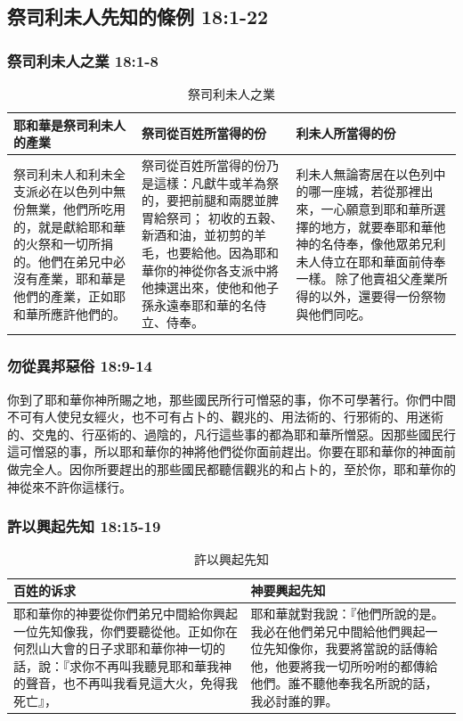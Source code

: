 \subsection{祭司利未人先知的條例 18:1-22 }
\subsubsection{祭司利未人之業 18:1-8 }
\begin{table}[H]
\begin{center}
\begin{tabular}{ p{4.9cm}|p{}|p{} } \toprule
耶和華是祭司利未人的產業&祭司從百姓所當得的份&利未人所當得的份\\\hline
祭司利未人和利未全支派必在以色列中無份無業，他們所吃用的，就是獻給耶和華的火祭和一切所捐的。他們在弟兄中必沒有產業，耶和華是他們的產業，正如耶和華所應許他們的。&祭司從百姓所當得的份乃是這樣：凡獻牛或羊為祭的，要把前腿和兩腮並脾胃給祭司； 初收的五穀、新酒和油，並初剪的羊毛，也要給他。因為耶和華你的神從你各支派中將他揀選出來，使他和他子孫永遠奉耶和華的名侍立、侍奉。&利未人無論寄居在以色列中的哪一座城，若從那裡出來，一心願意到耶和華所選擇的地方，就要奉耶和華他神的名侍奉，像他眾弟兄利未人侍立在耶和華面前侍奉一樣。 除了他賣祖父產業所得的以外，還要得一份祭物與他們同吃。 \\\hline
\end{tabular}
\end{center}
\caption{祭司利未人之業}
\end{table}


\subsubsection{勿從異邦惡俗 18:9-14}
你到了耶和華你神所賜之地，那些國民所行可憎惡的事，你不可學著行。你們中間不可有人使兒女經火，也不可有占卜的、觀兆的、用法術的、行邪術的、用迷術的、交鬼的、行巫術的、過陰的，凡行這些事的都為耶和華所憎惡。因那些國民行這可憎惡的事，所以耶和華你的神將他們從你面前趕出。你要在耶和華你的神面前做完全人。因你所要趕出的那些國民都聽信觀兆的和占卜的，至於你，耶和華你的神從來不許你這樣行。


\subsubsection{許以興起先知 18:15-19}
\begin{table}[H]
\begin{center}
\begin{tabular}{ p{8.5cm}|p{8.5cm}} \toprule
百姓的诉求&神要興起先知\\\hline
耶和華你的神要從你們弟兄中間給你興起一位先知像我，你們要聽從他。正如你在何烈山大會的日子求耶和華你神一切的話，說：『求你不再叫我聽見耶和華我神的聲音，也不再叫我看見這大火，免得我死亡』，&耶和華就對我說：『他們所說的是。我必在他們弟兄中間給他們興起一位先知像你，我要將當說的話傳給他，他要將我一切所吩咐的都傳給他們。誰不聽他奉我名所說的話，我必討誰的罪。 \\\hline
\end{tabular}
\end{center}
\caption{許以興起先知}
\end{table}


